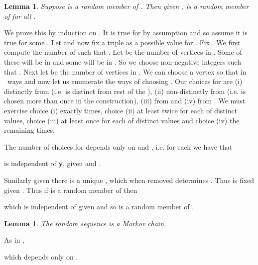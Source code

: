\documentclass[11pt]{article}
\def\mstar{\mnote{****}}
\newenvironment{proof}{{\bf Proof:}}{\hfill\mbox{}}
\def\bx{{\bf x}}
\def\by{{\bf y}}
\def\br{{\bf r}}
\def\bs{{\bf s}}
\def\bt{{\bf t}}
\def\bx{{\bf x}}
\newcommand{\mnote}[1]{\marginpar{\footnotesize\raggedright#1}}
\newcommand{\ignore}[1]{}
\newtheorem{lemma}[theorem]{Lemma}
\newcommand{\beq}[1]{}
\begin{document}
\begin{lemma}\label{lem2}
Suppose  is a random member of . Then given , 
is a random member of  for all .
\end{lemma}
\begin{proof}
We prove this by induction on . It is true for  by assumption and so assume it is true for some .
Let  and now fix a triple  as a possible value for . Fix .
We first compute the
number of  such that . Let  be the number of vertices in . Some of these
will be in  and some will be in . So we choose non-negative integers  such that 
. Next let  be the number of vertices in . 
We can choose a vertex  so that  in \mstar\  
ways and now let us enumerate the ways of choosing .
Our choices for  are (i) distinctly from  (i.e.  is distinct from rest of the ), (ii) 
non-distinctly from  (i.e.  is chosen more than once in the construction), (iii) from  and 
(iv) from . We must exercise choice (i) exactly  times, choice (ii) at least twice for each of  distinct values,
choice (iii) at least once for each of  distinct values and choice (iv) the remaining times.

\ignore{
Next let 
be the number of distinct neighbours of  in \bx. We will use the notation
 for a vector . 
The number of choices for \bx\
is then 
\beq{indy}
\sum_{\substack{0\leq c\leq d-a-b\\0\leq b_1\leq b}}\ 
\sum_{\substack{\br\in [d]^{b_1},\bs\in [d]^{b_2},\bt\in [d]^c\\|r|+|s|=d-a-c}}(n-t)
\binom{m-v'-v_1'}{a}\binom{v_1'}{b}\binom{v'}{d-a-b}(v')^{d-a-b}\binom{d}{c}\binom{d-c}{r_1,\ldots,s_b}.
\eeq 
(i)  choices for , (ii)  choices for 
the set of vertices of degree one in \bx\ that become of degree zero in \by, (iii)  choices for 
the set of vertices of degree at least two in  
that become of degree one in , (iv)  choices for the set of vertices of degree at least two in \bx\
that are incident with  and have degree at least two in \by, (v)  ways of filling in . 
}
The number of choices for  depends only on  and ,
i.e. for each  we have that 
 
is independent of \by, given  and
. 

Similarly given  there is a unique , which when removed determines
. Thus  is fixed given .  Thus if  is a random member of  then 

which is independent of  given  and so  is a random member of .
\end{proof}

\begin{lemma}
The random sequence  is a Markov chain.
\end{lemma}
\begin{proof}
As in \cite{AFP},

which depends only on .
\end{proof}
\end{document}
